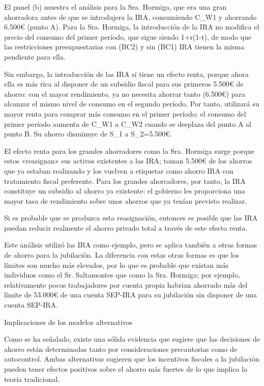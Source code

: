 \documentclass[10pt,a4paper]{article}
\begin{document}
El panel (b) muestra el análisis para la Sra. Hormiga, que era una gran ahorradora antes de que se introdujera la IRA, consumiendo C_{W1} y ahorrando 6.500€ (punto A). Para la Sra. Hormiga, la introducción de la IRA no modifica el precio del consumo del primer período, que sigue siendo 1+r\times(1-t), de modo que las restricciones presupuestarias con (BC2) y sin (BC1) IRA tienen la misma pendiente para ella.

Sin embargo, la introducción de las IRA sí tiene un efecto renta, porque ahora ella es más rica al disponer de un subsidio fiscal para sus primeros 5.500€ de ahorro: con el mayor rendimiento, ya no necesita ahorrar tanto (6.500€) para alcanzar el mismo nivel de consumo en el segundo período. Por tanto, utilizará su mayor renta para comprar más consumo en el primer período: el consumo del primer período aumenta de C_{W1} a C_{W2} cuando se desplaza del punto A al punto B. Su ahorro disminuye de S_1 a S_2=5.500€.

El efecto renta para los grandes ahorradores como la Sra. Hormiga surge porque estos «reasignan» sus activos existentes a las IRA; toman 5.500€ de los ahorros que ya estaban realizando y los vuelven a etiquetar como ahorro IRA con tratamiento fiscal preferente. Para los grandes ahorradores, por tanto, la IRA constituye un subsidio al ahorro ya existente: el gobierno les proporciona una mayor tasa de rendimiento sobre unos ahorros que ya tenían previsto realizar.

Si es probable que se produzca esta reasignación, entonces es posible que las IRA puedan reducir realmente el ahorro privado total a través de este efecto renta.

Este análisis utilizó las IRA como ejemplo, pero se aplica también a otras formas de ahorro para la jubilación. La diferencia con estas otras formas es que los límites son mucho más elevados, por lo que es probable que existan más individuos como el Sr. Saltamontes que como la Sra. Hormiga; por ejemplo, relativamente pocos trabajadores por cuenta propia habrían ahorrado más del límite de 53.000€ de una cuenta SEP-IRA para su jubilación sin disponer de una cuenta SEP-IRA.

Implicaciones de los modelos alternativos

Como se ha señalado, existe una sólida evidencia que sugiere que las decisiones de ahorro están determinadas tanto por consideraciones precautorias como de autocontrol. Ambas alternativas sugieren que los incentivos fiscales a la jubilación pueden tener efectos positivos sobre el ahorro más fuertes de lo que implica la teoría tradicional.
\end{document}
